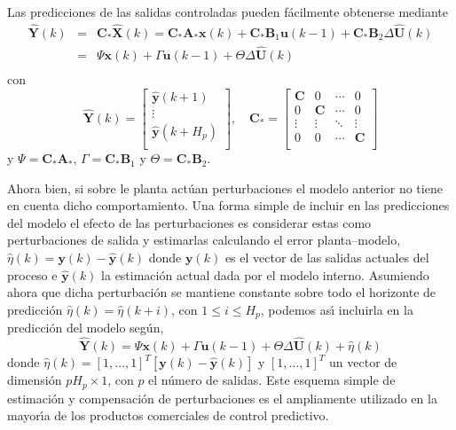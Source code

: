 Las predicciones de las salidas controladas pueden f{\'a}cilmente obtenerse mediante
\begin{equation}
\begin{array}{rcl}
    \mathbf{\hat{Y}}(k)&=&\mathbf{C}_*\mathbf{\hat{X}}(k)=\mathbf{C}_*\mathbf{A}_{*}\mathbf{x}(k)
                          +\mathbf{C}_*\mathbf{B}_{1}\mathbf{u}(k-1)
                          +\mathbf{C}_*\mathbf{B}_{2}\Delta\mathbf{\hat{U}}(k)\\
                       &=&\Psi \mathbf{x}(k)+\Gamma \mathbf{u}(k-1)+\Theta \Delta\mathbf{\hat{U}}(k)\\
\end{array}
\end{equation}
con
\begin{equation}
\mathbf{\hat{Y}}(k)=\left[
\begin{array}{c}
  \mathbf{\hat{y}}(k+1) \\
  \vdots \\
 \mathbf{\hat{y}}(k+H_p) \\
\end{array}
\right], \quad \mathbf{C}_*=\left[
\begin{array}{cccc}
 \mathbf{ C}      & 0      & \cdots & 0 \\
  0               & \mathbf{C}      & \cdots & 0 \\
  \vdots & \vdots & \ddots & \vdots \\
  0      & 0      & \cdots & \mathbf{C} \\
\end{array}
\right]
\end{equation}
y $\Psi=\mathbf{C}_*\mathbf{A}_{*}$, $\Gamma=\mathbf{C}_*\mathbf{B}_{1}$ y
$\Theta=\mathbf{C}_*\mathbf{B}_{2}$.

Ahora bien, si sobre le planta act{\'u}an perturbaciones el modelo anterior no tiene en cuenta dicho
comportamiento. Una forma simple de incluir en las predicciones del modelo el efecto de las perturbaciones
es considerar estas como perturbaciones de salida y estimarlas calculando el error planta--modelo,
$\hat{\eta}(k)=\mathbf{y}(k)-\mathbf{\hat{y}}(k)$ donde $\mathbf{y}(k)$ es el vector de las salidas actuales
del proceso e $\mathbf{\hat{y}}(k)$ la estimaci{\'o}n actual dada por el modelo interno. Asumiendo ahora que
dicha perturbaci{\'o}n se mantiene constante sobre todo el horizonte de predicci{\'o}n
$\hat{\eta}(k)=\hat{\eta}(k+i)$, con $1\leq i \leq H_p$, podemos as{\'\i} incluirla en la predicci{\'o}n del modelo
seg{\'u}n,
\begin{equation}
 \mathbf{\hat{Y}}(k)=\Psi \mathbf{x}(k)+\Gamma \mathbf{u}(k-1)+\Theta \Delta\mathbf{\hat{U}}(k)
                     +\hat{\eta}(k)
\end{equation}
donde $\hat{\eta}(k)=\left[1,\ldots,1\right]^{T}[\mathbf{y}(k)-\mathbf{\hat{y}}(k)]$ y
$\left[1,\ldots,1\right]^{T}$ un vector de dimensi{\'o}n $pH_p\times 1$, con $p$ el n{\'u}mero de salidas. Este
esquema simple de estimaci{\'o}n y compensaci{\'o}n de perturbaciones es el ampliamente utilizado en la mayor{\'\i}a de
los productos comerciales de control predictivo.

